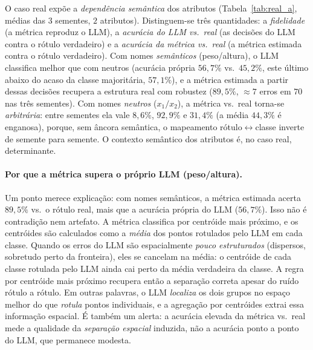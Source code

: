\documentclass[12pt,a4paper]{article}
\begin{document}
O caso real expõe a \emph{dependência semântica} dos atributos
(Tabela~\ref{tab:real_a}, médias das $3$ sementes, $2$ atributos). Distinguem-se três
quantidades: a \emph{fidelidade} (a métrica reproduz o LLM), a \emph{acurácia do LLM vs.\
real} (as decisões do LLM contra o rótulo verdadeiro) e a \emph{acurácia da métrica vs.\
real} (a métrica estimada contra o rótulo verdadeiro). Com nomes \emph{semânticos}
(peso/altura), o LLM classifica melhor que com neutros (acurácia própria $56{,}7\%$ vs.\
$45{,}2\%$, este último abaixo do acaso da classe majoritária, $57{,}1\%$), e a métrica
estimada a partir dessas decisões recupera a estrutura real com robustez ($89{,}5\%$,
$\approx 7$ erros em $70$ nas três sementes). Com nomes \emph{neutros} ($x_1/x_2$), a métrica
vs.\ real torna-se \emph{arbitrária}: entre sementes ela vale $8{,}6\%$, $92{,}9\%$ e
$31{,}4\%$ (a média $44{,}3\%$ é enganosa), porque, sem âncora semântica, o mapeamento
rótulo$\leftrightarrow$classe inverte de semente para semente. O contexto semântico dos
atributos é, no caso real, determinante.

\paragraph{Por que a métrica supera o próprio LLM (peso/altura).}
Um ponto merece explicação: com nomes semânticos, a métrica estimada acerta $89{,}5\%$ vs.\
o rótulo real, mais que a acurácia própria do LLM ($56{,}7\%$). Isso não é contradição nem
artefato. A métrica classifica por centróide mais próximo, e os centróides são calculados
como a \emph{média} dos pontos rotulados pelo LLM em cada classe. Quando os erros do LLM são
espacialmente \emph{pouco estruturados} (dispersos, sobretudo perto da fronteira), eles se
cancelam na média: o centróide de cada classe rotulada pelo LLM ainda cai perto da média
verdadeira da classe. A regra por centróide mais próximo recupera então a separação correta
apesar do ruído rótulo a rótulo. Em outras palavras, o LLM \emph{localiza} os dois grupos no
espaço melhor do que \emph{rotula} pontos individuais, e a agregação por centróides extrai
essa informação espacial. É também um alerta: a acurácia elevada da métrica vs.\ real mede a
qualidade da \emph{separação espacial} induzida, não a acurácia ponto a ponto do LLM, que
permanece modesta.
\end{document}
